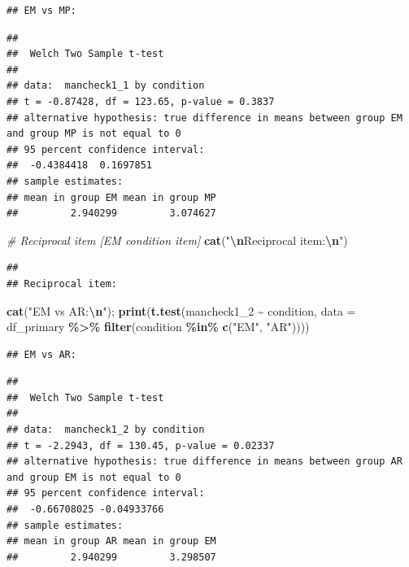 \documentclass[
]{article}
\newenvironment{Shaded}{\begin{snugshade}}{\end{snugshade}}
\newcommand{\AttributeTok}[1]{\textcolor[rgb]{0.13,0.29,0.53}{#1}}
\newcommand{\CommentTok}[1]{\textcolor[rgb]{0.56,0.35,0.01}{\textit{#1}}}
\newcommand{\FunctionTok}[1]{\textcolor[rgb]{0.13,0.29,0.53}{\textbf{#1}}}
\newcommand{\NormalTok}[1]{#1}
\newcommand{\SpecialCharTok}[1]{\textcolor[rgb]{0.81,0.36,0.00}{\textbf{#1}}}
\newcommand{\StringTok}[1]{\textcolor[rgb]{0.31,0.60,0.02}{#1}}
\begin{document}
\begin{verbatim}
## EM vs MP:
\end{verbatim}

\begin{verbatim}
## 
##  Welch Two Sample t-test
## 
## data:  mancheck1_1 by condition
## t = -0.87428, df = 123.65, p-value = 0.3837
## alternative hypothesis: true difference in means between group EM and group MP is not equal to 0
## 95 percent confidence interval:
##  -0.4384418  0.1697851
## sample estimates:
## mean in group EM mean in group MP 
##         2.940299         3.074627
\end{verbatim}

\begin{Shaded}
\begin{Highlighting}[]
\CommentTok{\# Reciprocal item [EM condition item]}
\FunctionTok{cat}\NormalTok{(}\StringTok{"}\SpecialCharTok{\textbackslash{}n}\StringTok{Reciprocal item:}\SpecialCharTok{\textbackslash{}n}\StringTok{"}\NormalTok{)}
\end{Highlighting}
\end{Shaded}

\begin{verbatim}
## 
## Reciprocal item:
\end{verbatim}

\begin{Shaded}
\begin{Highlighting}[]
\FunctionTok{cat}\NormalTok{(}\StringTok{"EM vs AR:}\SpecialCharTok{\textbackslash{}n}\StringTok{"}\NormalTok{); }\FunctionTok{print}\NormalTok{(}\FunctionTok{t.test}\NormalTok{(mancheck1\_2 }\SpecialCharTok{\textasciitilde{}}\NormalTok{ condition, }
       \AttributeTok{data =}\NormalTok{ df\_primary }\SpecialCharTok{\%\textgreater{}\%} \FunctionTok{filter}\NormalTok{(condition }\SpecialCharTok{\%in\%} \FunctionTok{c}\NormalTok{(}\StringTok{"EM"}\NormalTok{, }\StringTok{"AR"}\NormalTok{))))}
\end{Highlighting}
\end{Shaded}

\begin{verbatim}
## EM vs AR:
\end{verbatim}

\begin{verbatim}
## 
##  Welch Two Sample t-test
## 
## data:  mancheck1_2 by condition
## t = -2.2943, df = 130.45, p-value = 0.02337
## alternative hypothesis: true difference in means between group AR and group EM is not equal to 0
## 95 percent confidence interval:
##  -0.66708025 -0.04933766
## sample estimates:
## mean in group AR mean in group EM 
##         2.940299         3.298507
\end{verbatim}
\end{document}
